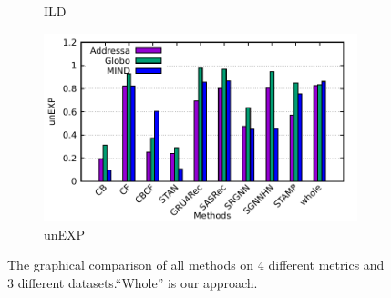 \begin{figure}[th]
\begin{subfigure}[b]{0.48\textwidth}
\caption{ILD}
\label{fig:ild}
\end{subfigure}
\hfill
\begin{subfigure}[b]{0.48\textwidth}
\centering
\includegraphics[width=\columnwidth]{fig/unexp.pdf}
\caption{unEXP}
\label{fig:unexp}
\end{subfigure}
\caption{The graphical comparison of all methods on 4 different metrics and 3 different datasets.``Whole'' is our approach.}
\label{fig:all}
\end{figure}

